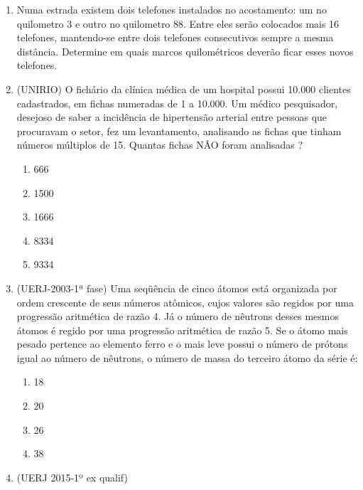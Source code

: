 \begin{enumerate}
\item Numa estrada existem dois telefones instalados no acostamento: um no quilometro 3 e outro no quilometro 88. Entre eles serão colocados mais 16 telefones, mantendo-se entre dois telefones consecutivos sempre a mesma distância. Determine em quais marcos quilométricos deverão ficar esses novos telefones.

\item (UNIRIO) O fichário da clínica médica de um hospital possui 10.000 clientes cadastrados, em fichas numeradas de 1 a 10.000. Um médico pesquisador, desejoso de saber a incidência de hipertensão arterial entre pessoas que procuravam o setor, fez um levantamento, analisando as fichas que tinham números múltiplos de 15. Quantas fichas NÃO foram analisadas ?
\begin{enumerate}
\item {} 
666

\item {} 
1500

\item {} 
1666

\item {} 
8334

\item {} 
9334

\end{enumerate}


\item (UERJ-2003-1ª fase) Uma seqüência de cinco átomos está organizada por ordem crescente de seus números atômicos, cujos valores são regidos por uma progressão aritmética de razão 4. Já o número de nêutrons desses mesmos átomos é regido por uma progressão aritmética de razão 5.
Se o átomo mais pesado pertence ao elemento ferro e o mais leve possui o número de prótons igual ao número de nêutrons, o número de massa do terceiro átomo da série é:
\clearpage

\begin{enumerate}
\item {} 
18

\item {} 
20

\item {} 
26

\item {} 
38

\end{enumerate}

\item (UERJ 2015-1º ex qualif)
\label{\detokenize{AF107-E:fig-charge}}
\begin{figure}[H]
\centering


\end{figure}
\end{enumerate}
